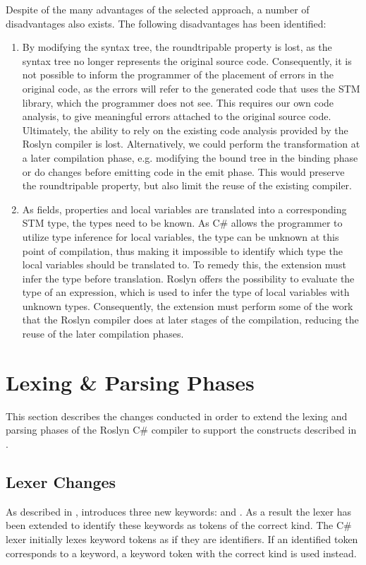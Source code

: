 Despite of the many advantages of the selected approach, a number of disadvantages also exists. The following disadvantages has been identified:
\begin{enumerate}
	\item By modifying the syntax tree, the roundtripable property is lost, as the syntax tree no longer represents the original source code. Consequently, it is not possible to inform the programmer of the placement of errors in the original code, as the errors will refer to the generated code that uses the \ac{STM} library, which the programmer does not see. This requires our own code analysis, to give meaningful errors attached to the original source code. Ultimately, the ability to rely on the existing code analysis provided by the Roslyn compiler is lost. Alternatively, we could perform the transformation at a later compilation phase, e.g. modifying the bound tree in the binding phase or do changes before emitting code in the emit phase. This would preserve the roundtripable property, but also limit the reuse of the existing compiler. 
	
	\item As  fields, properties and local variables are translated into a corresponding \ac{STM} type, the types need to be known. As C\# allows the programmer to utilize type inference for local variables, the type can be unknown at this point of compilation, thus making it impossible to identify which type the local variables should be translated to. To remedy this, the extension must infer the type before translation. Roslyn offers the possibility to evaluate the type of an expression, which is used to infer the type of  local variables with unknown types. Consequently, the extension must perform some of the work that the Roslyn compiler does at later stages of the compilation, reducing the reuse of the later compilation phases.
\end{enumerate}

\section{Lexing \& Parsing Phases}
This section describes the changes conducted in order to extend the lexing and parsing phases of the Roslyn C\# compiler to support the constructs described in .
\label{sec:roslyn_lexer_parser_changes}

\subsection{Lexer Changes}
As described in , \stmnamesp introduces three new keywords:   and . As a result the lexer has been extended to identify these keywords as tokens of the correct kind. The C\# lexer initially lexes keyword tokens as if they are identifiers. If an identified token corresponds to a keyword, a keyword token with the correct kind is used instead.

